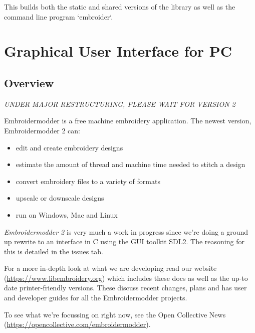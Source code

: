 \documentclass[a4paper]{report}
\begin{document}
This builds both the static and shared versions of the library as well
as the command line program `embroider`.


\section{Graphical User Interface for PC}
\label{GUI}

\subsection{Overview}

\emph{UNDER MAJOR RESTRUCTURING, PLEASE WAIT FOR VERSION 2}

Embroidermodder is a free machine embroidery application.
The newest version, Embroidermodder 2 can:

\begin{itemize}
\item edit and create embroidery designs
\item estimate the amount of thread and machine time needed to stitch a design
\item convert embroidery files to a variety of formats
\item upscale or downscale designs
\item run on Windows, Mac and Linux
\end{itemize}

\emph{Embroidermodder 2} is very much a work in progress since we're doing a ground
up rewrite to an interface in C using the GUI toolkit SDL2.
The reasoning for this is detailed in the issues tab.

For a more in-depth look at what we are developing read our
website (\url{https://www.libembroidery.org}) which includes these docs as well
as the up-to date printer-friendly versions. These discuss recent changes,
plans and has user and developer guides for all the Embroidermodder projects.

To see what we're focussing on right now, see the Open Collective
News (\url{https://opencollective.com/embroidermodder}).
\end{document}
